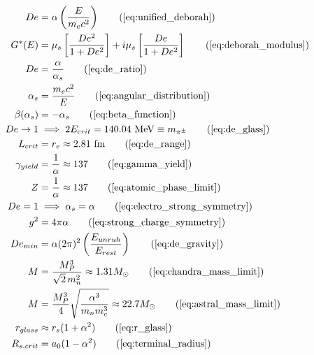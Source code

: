 \begin{tcolorbox}[recallbox, title={\ref{box:unified_deborah}. The Unified Cosmological Deborah Number}]
\begin{align}
    De &= \alpha \left( \frac{E}{m_e c^2} \right) \tag{\ref{eq:unified_deborah}} \\
    G^*(E) &= \mu_s \left[ \frac{De^2}{1 + De^2} \right] + i \mu_s \left[ \frac{De}{1 + De^2} \right] \tag{\ref{eq:deborah_modulus}} \\
    De &= \frac{\alpha}{\alpha_s} \tag{\ref{eq:de_ratio}} \\
    \alpha_s &= \frac{m_e c^2}{E} \tag{\ref{eq:angular_distribution}} \\
    \beta(\alpha_s) &= - \alpha_s \tag{\ref{eq:beta_function}} \\
    De \to 1 &\implies 2 E_{crit} = 140.04 \text{ MeV} \equiv m_{\pi^{\pm}} \tag{\ref{eq:de_glass}} \\
    L_{crit} &= r_e \approx 2.81 \text{ fm} \tag{\ref{eq:de_range}} \\ %
    \gamma_{yield} &= \frac{1}{\alpha} \approx 137 \tag{\ref{eq:gamma_yield}} \\
    Z &= \frac{1}{\alpha} \approx 137 \tag{\ref{eq:atomic_phase_limit}} \\
    De = 1 &\implies \alpha_s = \alpha \tag{\ref{eq:electro_strong_symmetry}} \\
    g^2 &= 4\pi\alpha \tag{\ref{eq:strong_charge_symmetry}} \\ %
    De_{min} &= \alpha (2\pi)^2 \left( \frac{E_{unruh}}{E_{rest}} \right) \tag{\ref{eq:de_gravity}} \\
    M &= \frac{M_P^3}{\sqrt{2}\, m_n^2} \approx 1.31 M_\odot \tag{\ref{eq:chandra_mass_limit}} \\ %
    M &= \frac{M_P^3}{4} \sqrt{ \frac{\alpha^3}{m_n m_e^3} } \approx 22.7 M_\odot \tag{\ref{eq:astral_mass_limit}} \\ %
    r_{glass} &\approx r_s (1 + \alpha^2) \tag{\ref{eq:r_glass}} \\
    R_{s,crit} &= a_0(1 - \alpha^2) \tag{\ref{eq:terminal_radius}}
\end{align}
\end{tcolorbox}




